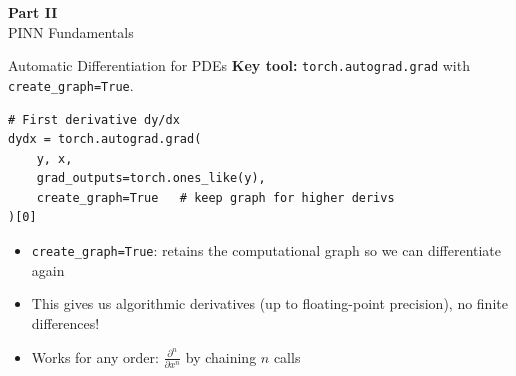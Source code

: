 \documentclass[aspectratio=169,11pt]{beamer}
\newcommand{\emphc}[1]{\textcolor{harvardcrimson}{#1}}
\begin{document}

\begin{frame}{}
\vfill
\begin{center}
{\Huge \textcolor{uzhblue}{\textbf{Part II}}}\\[12pt]
{\LARGE PINN Fundamentals}
\end{center}
\vfill
\end{frame}

\begin{frame}[fragile]{Automatic Differentiation for PDEs}
\textbf{Key tool:} \texttt{torch.autograd.grad} with \texttt{create\_graph=True}.

\vspace{0.4em}
\begin{lstlisting}
# First derivative dy/dx
dydx = torch.autograd.grad(
    y, x,
    grad_outputs=torch.ones_like(y),
    create_graph=True   # keep graph for higher derivs
)[0]
\end{lstlisting}

\vspace{0.3em}
\begin{itemize}
    \item \texttt{create\_graph=True}: retains the computational graph so we can differentiate \emphc{again}
    \item This gives us \emphc{algorithmic} derivatives (up to floating-point precision), no finite differences!
    \item Works for \emphc{any order}: $\frac{\partial^n}{\partial x^n}$ by chaining $n$ calls
\end{itemize}
\end{frame}
\end{document}
